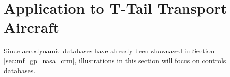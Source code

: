 \section{Application to T-Tail Transport Aircraft} \label{sec:gtt_dbs}

Since aerodynamic databases have already been showcased in Section \ref{sec:mf_gp_nasa_crm}, illustrations in this section will focus on controls databases. 